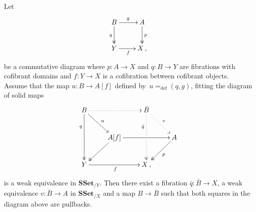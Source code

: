 \documentclass[reqno,10pt,a4paper,oneside,draft]{amsart}
\numberwithin{equation}{section}
\theoremstyle{mythm}
\theoremstyle{mydef}
\theoremstyle{myrmk}
\newcommand{\defeq}{=_{\operatorname{def}}}
\newcommand{\co}{\colon}
\newcommand{\SSet}{\mathbf{SSet}}
\begin{document}
\begin{proposition}
\label{Prop:Homotopy_ext_prop}
Let 
\[
\xymatrix{
B \ar[r]^g \ar@{->>}[d]_q & A \ar@{->>}[d]^p \\
Y \ar[r]_f & X \, ,}
\]
be a commutative diagram where $p \co A \to X$ and $q \co B \to Y$ are fibrations with cofibrant domains and $f \co Y \to X$ is
a cofibration between cofibrant objects. Assume that the map $u \co B \to A[f]$ defined by~$u \defeq (q, g)$, fitting the diagram 
of solid maps
\[ 
\xymatrix{
 B
  \ar@{.>}[rr]
  \ar[dr]^{u}
  \ar@{->>}[dd]_(.3){q}
&&
  \bar{B}
  \ar@{.>}[dr]^{v}
  \ar@{.>>}[dd]_(.3){\bar{q}}|{\hole}
&\\&
  A[f] 
  \ar[rr]
  \ar@{->>}[dl]
&&
  A
  \ar@{->>}[dl]^{p}
\\
  Y
  \ar[rr]_{f}
&&
  X \, ,
&
}
\]
is a weak equivalence in $\SSet_{/ Y}$. Then there exist a fibration $\bar{q} \co \bar{B} \to X$, a weak equivalence $v \co \bar{B} \to A$ in $\SSet_{/X}$ and a map $B \to \bar{B}$ such that both squares in the diagram above are pullbacks. 
\end{proposition}
\end{document}
